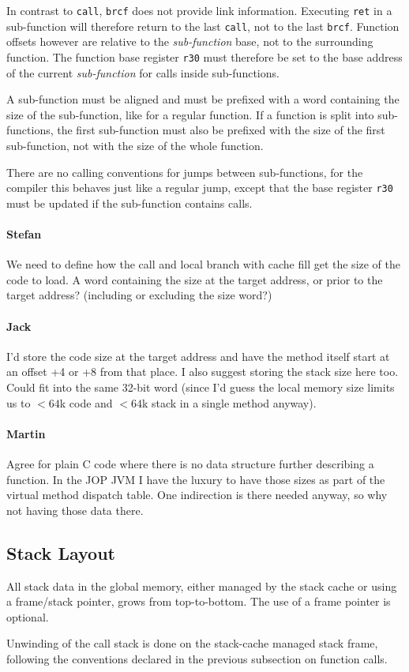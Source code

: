 \documentclass{IEEEtran}
\newcommand{\comment}[3]{\paragraph*{\textbf{#1}}{\color{#3}#2}}
\newcommand{\martin}[1]{\comment{Martin}{#1}{Blue}}
\newcommand{\stefan}[1]{\comment{Stefan}{#1}{RoyalPurple}}
\newcommand{\jack}[1]{\comment{Jack}{#1}{Magenta}}
\begin{document}
In contrast to \texttt{call}, \texttt{brcf} does not provide link information.
Executing \texttt{ret} in a sub-function will therefore return to the last \texttt{call}, not to the last \texttt{brcf}.
Function offsets however are relative to the \emph{sub-function} base, not to the surrounding function. 
The function base register \texttt{r30} must therefore be set to the base address
of the current \emph{sub-function} for calls inside sub-functions.

A sub-function must be aligned and must be prefixed with a word containing the size of the sub-function,
like for a regular function. If a function is split into sub-functions, the first sub-function
must also be prefixed with the size of the first sub-function, not with the size of the whole function.

There are no calling conventions for jumps between sub-functions, for the compiler 
this behaves just like a regular jump, except that the base register \texttt{r30} must
be updated if the sub-function contains calls.



\stefan{We need to define how the call and local branch with cache fill get the size of the code to load. A word
containing the size at the target address, or prior to the target address? (including or excluding the size word?)}

\jack{I'd store the code size at the target address and have the
method itself start at an offset +4 or +8 from that place. I also
suggest storing the stack size here too. Could fit into the same
32-bit word (since I'd guess the local memory size limits us to
$<64$k code and $<64$k stack in a single method anyway).}

\martin{Agree for plain C code where there is no data structure
further describing a function. In the JOP JVM I have the luxury
to have those sizes as part of the virtual method dispatch table.
One indirection is there needed anyway, so why not having those
data there.}

\subsection{Stack Layout}

All stack data in the global memory, either managed by the stack cache or using
a frame/stack pointer, grows from top-to-bottom. The use of a frame pointer is
optional.

Unwinding of the call stack is done on the stack-cache managed stack frame,
following the conventions declared in the previous subsection on function calls.
\end{document}
